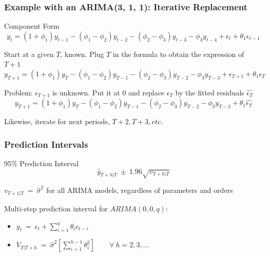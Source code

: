 \documentclass{beamer}
\newenvironment{wideitemize}{\itemize\addtolength{\itemsep}{10pt}}{\enditemize}
\newenvironment{wideenumerate}{\enumerate\addtolength{\itemsep}{10pt}}{\endenumerate}
\begin{document}
\begin{frame}
  \frametitle{Example with an ARIMA(3, 1, 1): Iterative Replacement}

  \begin{block}{Component Form}
    \begin{equation*}
      y_t = (1+\phi_1)y_{t-1} - (\phi_1 - \phi_2)y_{t-2} - (\phi_2 - \phi_3)y_{t-3} - \phi_3 y_{t-4} + \epsilon_t + \theta_1 \epsilon_{t-1}
    \end{equation*}
  \end{block}
  
  \begin{wideenumerate}
  \item Start at a given $T$, known. Plug $T$ in the formula to obtain the expression of $T+1$
    \begin{equation*}
      y_{T+1} = (1+\phi_1)y_{T} - (\phi_1 - \phi_2)y_{T-1} - (\phi_2 - \phi_3)y_{T-2} - \phi_3 y_{T-3} + \epsilon_{T+1} + \theta_1 \epsilon_{T}
    \end{equation*}

  \item Problem: $\epsilon_{T+1}$ is unknown. Put it at 0 and replace $\epsilon_{T}$ by the fitted residuals $\hat{\epsilon_{T}}$
    \begin{equation*}
      y_{T+1} = (1+\phi_1)y_{T} - (\phi_1 - \phi_2)y_{T-1} - (\phi_2 - \phi_3)y_{T-2} - \phi_3 y_{T-3} +  \theta_1 \hat{\epsilon_{T}}
    \end{equation*}

\item Likewise, iterate for next periods, $T+2, T+3, etc.$
    
    \end{wideenumerate}  
\end{frame}


\begin{frame}
  \frametitle{Prediction Intervals}


  \begin{block}{95\% Prediction Interval}
    \begin{equation*}
      \hat{y}_{T+h|T} \ \pm \ 1.96\sqrt{v_{T+h|T}}
    \end{equation*}
  \end{block}

    \begin{wideitemize}
    \item $v_{T+1|T} \ = \ \hat{\sigma}^2$ for all ARIMA models, regardless of parameters and orders
      \item Multi-step prediction interval for $ARIMA(0,0,q)$:
      \begin{itemize}
      \item $y_t \ = \ \epsilon_t + \sum_{i=1}^q \theta_i \epsilon_{t-i}$
      \item $V_{T|T+h} \ = \ \hat{\sigma}^2 \left[ \sum_{i=1}^{h-1}\theta_i^2 \right] \qquad \forall \ h = 2, 3, \dots$
      \end{itemize}
      
    \end{wideitemize}      
\end{frame}
\end{document}
